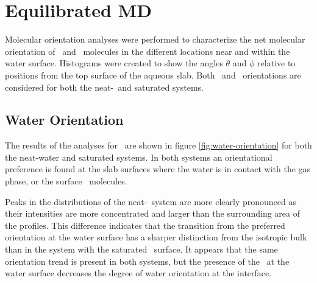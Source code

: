 \section{Equilibrated MD}

Molecular orientation analyses were performed to characterize the net molecular orientation of \wat~and \suldiox~molecules in the different locations near and within the water surface. Histograms were created to show the angles $\theta$ and $\phi$ relative to positions from the top surface of the aqueous slab. Both \wat~and \suldiox~orientations are considered for both the neat-\wat~and saturated systems.

\subsection{Water Orientation}

The results of the analyses for \wat~are shown in figure \ref{fig:water-orientation} for both the neat-water and saturated systems. In both systems an orientational preference is found at the slab surfaces where the water is in contact with the gas phase, or the surface \suldiox~molecules. %

Peaks in the distributions of the neat-\wat~system are more clearly pronounced as their intensities are more concentrated and larger than the surrounding area of the profiles. This difference indicates that the transition from the preferred orientation at the water surface has a sharper distinction from the isotropic bulk than in the system with the saturated \suldiox~surface. It appears that the same orientation trend is present in both systems, but the presence of the \suldiox~at the water surface decreases the degree of water orientation at the interface.

